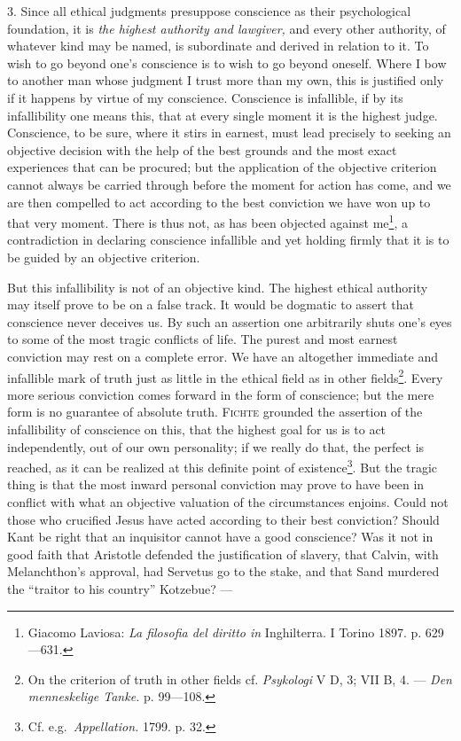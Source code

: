 \documentclass[12pt,a4paper,openany]{book}
\newcommand{\opage}[1]{\marginnote{\footnotesize\textit{[#1]}}}
\begin{document}
3. Since all ethical judgments presuppose conscience as their psychological foundation, it is \textit{the
highest authority and lawgiver,} and every other authority, of whatever kind may be named, is
subordinate and derived in relation to it. To wish to go beyond one's conscience is to wish to go beyond
oneself. Where I bow to another man whose judgment I trust more than my own, this is justified only if it
happens by virtue of my conscience. Conscience is infallible, if by its infallibility one means this,
that at every single moment it is
\opage{93}the highest judge. Conscience, to be sure, where it stirs in earnest, must lead precisely to seeking
an objective decision with the help of the best grounds and the most exact experiences that can be
procured; but the application of the objective criterion cannot always be carried through before the
moment for action has come, and we are then compelled to act according to the best conviction we have
won up to that very moment. There is thus not, as has been objected against me\footnote[1]{Giacomo
Laviosa: \textit{La filosofia del diritto in} Inghilterra. I Torino 1897. p. 629---631.}, a
contradiction in declaring conscience infallible and yet holding firmly that it is to be guided by an
objective criterion.

But this infallibility is not of an objective kind. The highest ethical authority may itself prove to be
on a false track. It would be dogmatic to assert that conscience never deceives us. By such an assertion
one arbitrarily shuts one's eyes to some of the most tragic conflicts of life. The purest and most
earnest conviction may rest on a complete error. We have an altogether immediate and infallible mark of
truth just as little in the ethical field as in other fields\footnote[2]{On the criterion of truth in
other fields cf. \textit{Psykologi} V D, 3; VII B, 4. --- \textit{Den menneskelige Tanke.} p.
99---108.}. Every more serious conviction comes forward in the form of conscience; but the mere form is
no guarantee of absolute truth. \textsc{Fichte} grounded the assertion of the infallibility of conscience
on this, that the highest goal for us is to act independently, out of our own personality; if we really
do that, the perfect is reached, as it can be realized at this definite point of existence\footnote[3]{Cf.
e.g.\ \textit{Appellation.} 1799. p. 32.}. But the tragic thing is that the most inward personal
conviction may prove to have been in conflict with what an objective valuation of the circumstances
enjoins. Could not those who crucified Jesus have acted according to their best conviction? Should Kant
be right that an inquisitor cannot have a good conscience? Was it not in good faith that Aristotle
defended
\opage{94}the justification of slavery, that Calvin, with Melanchthon's approval, had Servetus go to the stake,
and that Sand murdered the ``traitor to his country'' Kotzebue? ---
\end{document}
